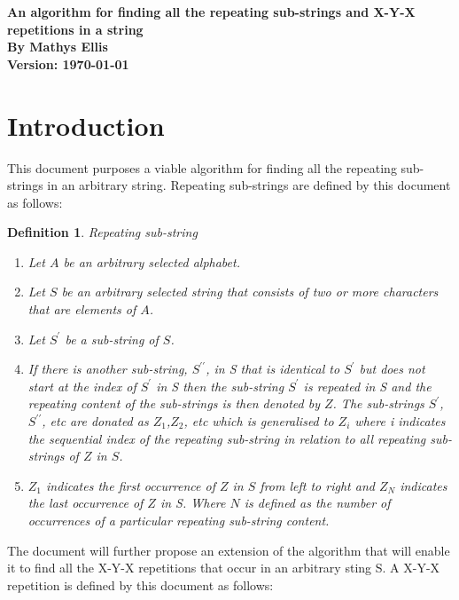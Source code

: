 \documentclass[12pt]{article}
\newtheorem{defn}{Definition}[section]
\begin{document}
\begin{center}
	\LARGE\textbf{An algorithm for finding all the repeating sub-strings and X-Y-X repetitions in a string}
	\\
	\vspace{0.5in}
	\large \textbf{By Mathys Ellis}
	\\
	\vspace{0.5in}
	\large \textbf{Version: \today}
\end{center}

\newpage
\tableofcontents
\newpage
\section{Introduction}
\begin{flushleft}
	This document purposes a viable algorithm for finding all the repeating sub-strings in an arbitrary string. Repeating sub-strings are defined by this document as follows:\\
	\begin{defn}
	    Repeating sub-string   
		\begin{enumerate}
			\item Let $A$ be an arbitrary selected alphabet.
			\item Let $S$ be an arbitrary selected string that consists of two or more characters that are elements of $A$.
			\item Let  $S^{\prime}$ be a sub-string of $S$.
			\item If there is another sub-string,  $S^{\prime\prime}$, in S that is identical to  $S^{\prime}$ but does not start at the index of  $S^{\prime}$ in S then the sub-string  $S^{\prime}$ is repeated in S and the repeating content of the sub-strings is then denoted by $Z$. The sub-strings $S^{\prime}$, $S^{\prime\prime}$, etc are donated as $Z_{1}$,$Z_{2}$, etc which is generalised to $Z_{i}$ where i indicates the sequential index of the repeating sub-string in relation to all repeating sub-strings of $Z$ in $S$.
			\item $Z_{1}$ indicates the first occurrence of $Z$ in $S$ from left to right and $Z_{N}$ indicates the last occurrence of $Z$ in S. Where $N$ is defined as the number of occurrences of a particular repeating sub-string content.  
		\end{enumerate}
	\end{defn}
	The document will further propose an extension of the algorithm that will enable it to find all the X-Y-X repetitions that occur in an arbitrary sting S. A X-Y-X repetition is defined by this document as follows:   

\end{flushleft}
\end{document}
